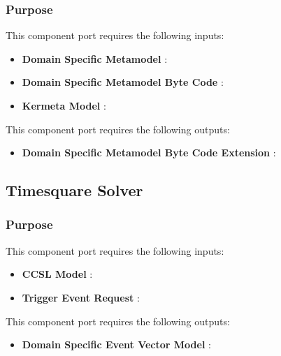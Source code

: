 \documentclass{gemoc} %
\begin{document}

\subsubsection{Purpose}

This component port requires the following inputs:
\begin{itemize}
  \item \textbf{Domain Specific Metamodel} :
  \item \textbf{Domain Specific Metamodel Byte Code} :
  \item \textbf{Kermeta Model} :
\end{itemize}

This component port requires the following outputs:
\begin{itemize}
  \item \textbf{Domain Specific Metamodel Byte Code Extension} :
\end{itemize}

\subsection{Timesquare Solver}


\subsubsection{Purpose}

This component port requires the following inputs:
\begin{itemize}
  \item \textbf{CCSL Model} :
  \item \textbf{Trigger Event Request} :
\end{itemize}

This component port requires the following outputs:
\begin{itemize}
  \item \textbf{Domain Specific Event Vector Model} :
\end{itemize}
\end{document}
